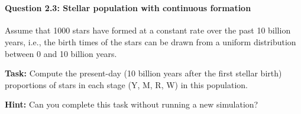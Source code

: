 \documentclass[11pt]{article}
\begin{document}
    \begin{center}
    \end{center}
    { \hspace*{\fill} \\}
    
    \paragraph{Question 2.3: Stellar population with continuous
formation}\label{question-2.3-stellar-population-with-continuous-formation}

Assume that 1000 stars have formed at a constant rate over the past 10
billion years, i.e., the birth times of the stars can be drawn from a
uniform distribution between 0 and 10 billion years.

\textbf{Task:} Compute the present-day (10 billion years after the first
stellar birth) proportions of stars in each stage (Y, M, R, W) in this
population.

\textbf{Hint:} Can you complete this task without running a new
simulation?
\end{document}
